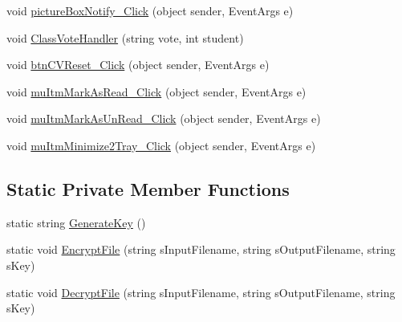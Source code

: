 \begin{DoxyCompactItemize}
void \hyperlink{class_sr_p___classroom_inq_1_1frm_classrrom_inq_acd9ffc2f20b9248f26b20a85b4ad947f}{picture\-Box\-Notify\-\_\-\-Click} (object sender, \-Event\-Args e)
\item 
void \hyperlink{class_sr_p___classroom_inq_1_1frm_classrrom_inq_ae1f8913d324d1be6740be0d839b3fbf2}{\-Class\-Vote\-Handler} (string vote, int student)
\item 
void \hyperlink{class_sr_p___classroom_inq_1_1frm_classrrom_inq_a029901904e102f3d9168a7779e43ec48}{btn\-C\-V\-Reset\-\_\-\-Click} (object sender, \-Event\-Args e)
\item 
void \hyperlink{class_sr_p___classroom_inq_1_1frm_classrrom_inq_a9e78ca4cfbab725c9ff4ed2e804cfff7}{mu\-Itm\-Mark\-As\-Read\-\_\-\-Click} (object sender, \-Event\-Args e)
\item 
void \hyperlink{class_sr_p___classroom_inq_1_1frm_classrrom_inq_a0f7d0dbc357b6823f39b25e46842a86c}{mu\-Itm\-Mark\-As\-Un\-Read\-\_\-\-Click} (object sender, \-Event\-Args e)
\item 
void \hyperlink{class_sr_p___classroom_inq_1_1frm_classrrom_inq_a1252a0b67bdfcf086327657bf19452ec}{mu\-Itm\-Minimize2\-Tray\-\_\-\-Click} (object sender, \-Event\-Args e)
\end{DoxyCompactItemize}
\subsection*{\-Static \-Private \-Member \-Functions}
\begin{DoxyCompactItemize}
\item 
static string \hyperlink{class_sr_p___classroom_inq_1_1frm_classrrom_inq_a08e314c225eb3c62963d0f268c656163}{\-Generate\-Key} ()
\item 
static void \hyperlink{class_sr_p___classroom_inq_1_1frm_classrrom_inq_a50670d50ceb8042c197d27b2ce179f36}{\-Encrypt\-File} (string s\-Input\-Filename, string s\-Output\-Filename, string s\-Key)
\item 
static void \hyperlink{class_sr_p___classroom_inq_1_1frm_classrrom_inq_a0655d5baf561da80816166c61c6605af}{\-Decrypt\-File} (string s\-Input\-Filename, string s\-Output\-Filename, string s\-Key)
\end{DoxyCompactItemize}
